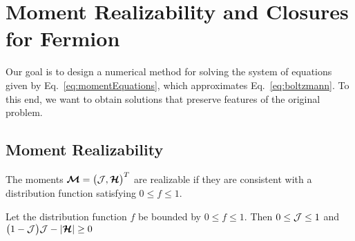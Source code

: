 \section{Moment Realizability and Closures for Fermion}
\label{sec:realizability}

Our goal is to design a numerical method for solving the system of equations given by Eq.~\eqref{eq:momentEquations}, which approximates Eq.~\eqref{eq:boltzmann}.  
To this end, we want to obtain solutions that preserve features of the original problem. 

\subsection{Moment Realizability}

\begin{define}
  The moments $\boldsymbol{\mathcal{M}}=\big(\mathcal{J},\boldsymbol{\mathcal{H}}\big)^{T}$ are realizable if they are consistent with a distribution function satisfying $0\le f \le 1$.
\end{define}
\begin{lemma}
  Let the distribution function $f$ be bounded by $0\le f \le1$.  
  Then $0\le\mathcal{J}\le1$ and $\big(1-\mathcal{J}\big)\mathcal{J}-|\boldsymbol{\mathcal{H}}|\ge0$
\end{lemma}
